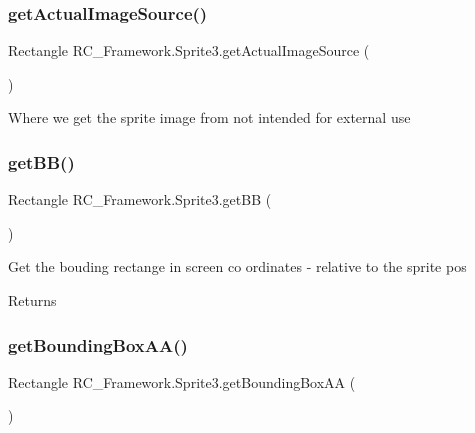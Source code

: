 \subsubsection{\texorpdfstring{get\+Actual\+Image\+Source()}{getActualImageSource()}}
{\footnotesize\ttfamily Rectangle R\+C\+\_\+\+Framework.\+Sprite3.\+get\+Actual\+Image\+Source (\begin{DoxyParamCaption}{ }\end{DoxyParamCaption})}



Where we get the sprite image from not intended for external use 

\mbox{\label{class_r_c___framework_1_1_sprite3_a16549a56813ed7daed2a64f6d2c3fdaf}} 
\subsubsection{\texorpdfstring{get\+B\+B()}{getBB()}}
{\footnotesize\ttfamily Rectangle R\+C\+\_\+\+Framework.\+Sprite3.\+get\+BB (\begin{DoxyParamCaption}{ }\end{DoxyParamCaption})}



Get the bouding rectange in screen co ordinates -\/ relative to the sprite pos 

\begin{DoxyReturn}{Returns}

\end{DoxyReturn}
\mbox{\label{class_r_c___framework_1_1_sprite3_a1069512793423e1c5f3205d053e11d66}} 
\subsubsection{\texorpdfstring{get\+Bounding\+Box\+A\+A()}{getBoundingBoxAA()}}
{\footnotesize\ttfamily Rectangle R\+C\+\_\+\+Framework.\+Sprite3.\+get\+Bounding\+Box\+AA (\begin{DoxyParamCaption}{ }\end{DoxyParamCaption})}



